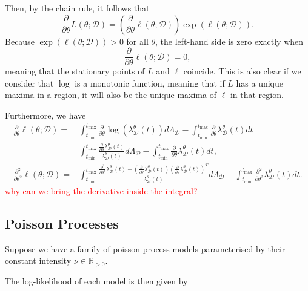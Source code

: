 \documentclass[honours,12pt]{unswthesis}
\numberwithin{equation}{section}
\begin{document}
Then, by the chain rule, it follows that
$$\frac{\partial}{\partial\theta}L(\theta;\mathcal{D}) = \left(\frac{\partial}{\partial\theta}\ell(\theta;\mathcal{D})\right) \exp\left(\ell(\theta;\mathcal{D})\right).$$
Because $\exp\left(\ell(\theta;\mathcal{D})\right)>0$ for all $\theta$, the left-hand side is zero exactly when
$$\frac{\partial}{\partial\theta}\ell\left(\theta;\mathcal{D}\right)=0,$$
meaning that the stationary points of $L$ and $\ell$ coincide. This is also clear if we consider that $\log$ is a monotonic function, meaning that if $L$ has a unique maxima in a region, it will also be the unique maxima of $\ell$ in that region.

Furthermore, we have
\begin{equation*}
	\begin{align}
		\frac{\partial}{\partial\theta}\ell(\theta;\mathcal{D})
		= & \int_{t_\mathrm{min}}^{t_\mathrm{max}}\frac{\partial}{\partial\theta}\log(\lambda_\mathcal{D}^\theta(t))d\Lambda_\mathcal{D}-\int_{t_\mathrm{min}}^{t_\mathrm{max}}\frac{\partial}{\partial\theta}\lambda_\mathcal{D}^\theta(t) dt\\
		= & \int_{t_\mathrm{min}}^{t_\mathrm{max}}\frac{\frac{\partial}{\partial\theta}\lambda_\mathcal{D}^\theta(t)}{\lambda_\mathcal{D}^\theta(t)}d\Lambda_\mathcal{D}-\int_{t_\mathrm{min}}^{t_\mathrm{max}}\frac{\partial}{\partial\theta}\lambda_\mathcal{D}^\theta(t) dt,\\
		\frac{\partial^2}{\partial\theta^2}\ell(\theta;\mathcal{D})
		= & \int_{t_\mathrm{min}}^{t_\mathrm{max}}\frac{\frac{\partial^2}{\partial\theta^2}\lambda_\mathcal{D}^\theta(t) - \left(\frac{\partial}{\partial\theta}\lambda_\mathcal{D}^\theta(t)\right)\left(\frac{\partial}{\partial\theta}\lambda_\mathcal{D}^\theta(t)\right)^T}{\lambda_\mathcal{D}^\theta(t)}d\Lambda_\mathcal{D} - \int_{t_\mathrm{min}}^{t_\mathrm{max}}\frac{\partial^2}{\partial\theta^2}\lambda_\mathcal{D}^\theta(t) dt.
	\end{align}
\end{equation*}
\textcolor{red}{why can we bring the derivative inside the integral?}

\subsection{Poisson Processes}
Suppose we have a family of poisson process models parameterised by their constant intensity $\nu\in\mathbb{R}_{>0}$.

The log-likelihood of each model is then given by
\end{document}
